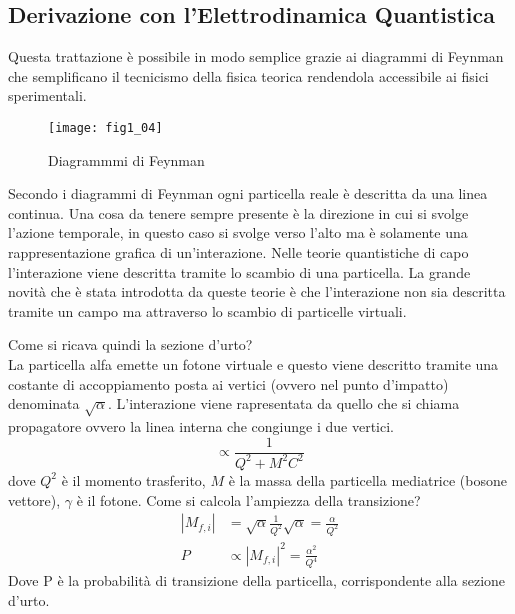 \subsection{Derivazione con l'Elettrodinamica Quantistica}
Questa trattazione è possibile in modo semplice grazie ai diagrammi di Feynman che semplificano il tecnicismo della fisica teorica rendendola accessibile ai fisici sperimentali.
\begin{figure}[h]
\centering
\texttt{[image: fig1\_04]}
\caption{Diagrammmi di Feynman}
\end{figure}
Secondo i diagrammi di Feynman ogni particella reale è descritta da una linea continua. Una cosa da tenere sempre presente è la direzione in cui si svolge l'azione temporale, in questo caso si svolge verso l'alto ma è solamente una rappresentazione grafica di un'interazione.
Nelle teorie quantistiche di capo l'interazione viene descritta tramite lo scambio di una particella.
La grande novità che è stata introdotta da queste teorie è che l'interazione non sia descritta tramite un campo ma attraverso lo scambio di particelle virtuali.

Come si ricava quindi la sezione d'urto?\\
La particella alfa emette un fotone virtuale e questo viene descritto tramite una costante di accoppiamento posta ai vertici (ovvero nel punto d'impatto) denominata $\sqrt{\alpha}$. 
L'interazione viene rapresentata da quello che si chiama propagatore ovvero la linea interna che congiunge i due vertici.
\begin{equation}
\propto \frac{1}{Q^2+M^2C^2}
\end{equation}
dove $Q^2$ è il momento trasferito, $M$ è la massa della particella mediatrice (bosone vettore), $\gamma$ è il fotone.
Come si calcola l'ampiezza della transizione?
\begin{equation}
\begin{split}
|M_{f,i}| &=\sqrt{\alpha}\frac{1}{Q^2}\sqrt{\alpha}=\frac{\alpha}{Q^2}\\
P &\propto |M_{f,i}|^2 =\frac{\alpha^2}{Q^4}
\end{split}
\end{equation}
Dove P è la probabilità di transizione della particella, corrispondente alla sezione d'urto.


